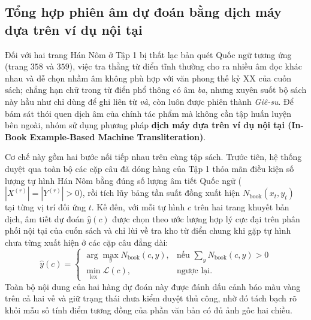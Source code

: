 \subsection{Tổng hợp phiên âm dự đoán bằng dịch máy dựa trên ví dụ nội tại}

Đối với hai trang Hán Nôm ở Tập 1 bị thất lạc bản quét Quốc ngữ tương ứng (trang $358$ và $359$), việc tra thẳng từ điển tĩnh thường cho ra nhiều âm đọc khác nhau và dễ chọn nhầm âm không phù hợp với văn phong thế kỷ XX của cuốn sách; chẳng hạn chữ  trong từ điển phổ thông có âm \textit{ba}, nhưng xuyên suốt bộ sách này hầu như chỉ dùng để ghi liên từ \textit{và}, còn  luôn được phiên thành \textit{Giê-su}. Để bám sát thói quen dịch âm của chính tác phẩm mà không cần tập huấn luyện bên ngoài, nhóm sử dụng phương pháp \textbf{dịch máy dựa trên ví dụ nội tại (In-Book Example-Based Machine Transliteration)}.

Cơ chế này gồm hai bước nối tiếp nhau trên cùng tập sách. Trước tiên, hệ thống duyệt qua toàn bộ các cặp câu đã dóng hàng của Tập 1 thỏa mãn điều kiện số lượng tự hình Hán Nôm bằng đúng số lượng âm tiết Quốc ngữ ($|X^{(r)}| = |Y^{(r)}| > 0$), rồi tích lũy bảng tần suất đồng xuất hiện $N_{\text{book}}(x_t, y_t)$ tại từng vị trí đối ứng $t$. Kế đến, với mỗi tự hình $c$ trên hai trang khuyết bản dịch, âm tiết dự đoán $\hat{y}(c)$ được chọn theo ước lượng hợp lý cực đại trên phân phối nội tại của cuốn sách và chỉ lùi về tra kho từ điển chung khi gặp tự hình chưa từng xuất hiện ở các cặp câu đẳng dài:
\begin{equation}
    \hat{y}(c) =
    \begin{cases}
        \arg\max_{y} N_{\text{book}}(c, y), & \text{nếu } \sum_{y} N_{\text{book}}(c, y) > 0 \\
        \min_{\text{lex}} \mathcal{L}(c), & \text{ngược lại.}
    \end{cases}
\end{equation}
Toàn bộ nội dung của hai hàng dự đoán này được đánh dấu cảnh báo màu vàng trên cả hai vế và giữ trạng thái chưa kiểm duyệt thủ công, nhờ đó tách bạch rõ khỏi mẫu số tính điểm tương đồng của phần văn bản có đủ ảnh gốc hai chiều.
